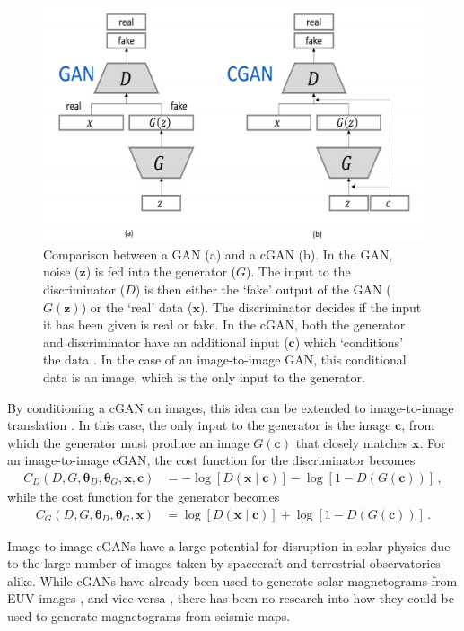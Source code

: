 \documentclass[11pt,a4paper,onecolumn]{report}
\begin{document}
\begin{figure}[t]
  \centering
  \includegraphics[width = 0.6\linewidth]{gan_cgan.png}
  \caption{Comparison between a GAN (a) and a cGAN (b). In the GAN, noise
  (\(\bm{z}\)) is fed into the generator (\(G\)). The input to the discriminator
  (\(D\)) is then either the `fake' output of the GAN (\(G(\bm{z})\)) or the
  `real' data (\(\bm{x}\)). The discriminator decides if the input it has been
  given is real or fake. In the cGAN, both the generator and discriminator have
  an additional input (\(\bm{c}\)) which `conditions' the data
  \citep{mirza_conditional_2014}. In the case of an image-to-image GAN, this
  conditional data is an image, which is the only input to the generator. }
  \label{fig:gans}
\end{figure}


By conditioning a cGAN on images, this idea can be extended to image-to-image
translation \citep{isola2017image}. In this case, the only input to the generator
is the image \(\bm{c}\), from which the generator must produce an image
\(G(\bm{c})\) that closely matches \(\bm{x}\). For an image-to-image cGAN, the
cost function for the discriminator becomes
\begin{align}
  C_D(D, G, \bm{\theta}_D, \bm{\theta}_G, \bm{x}, \bm{c}) &=
  -\log[D(\bm{x}\mid \bm{c})] - \log[1 - D(G(\bm{c}))]\,,
\end{align}
while the cost function for the generator becomes
\begin{align}
  C_G(D, G, \bm{\theta}_D, \bm{\theta}_G, \bm{x})
  &= \log[D(\bm{x}\mid \bm{c})] + \log[1 - D(G(\bm{c}))]\,.
\end{align}


Image-to-image cGANs have a large potential for disruption in solar physics due
to the large number of images taken by spacecraft and terrestrial observatories
alike. While cGANs have already been used to generate solar magnetograms from EUV images
\citep{Kim2019}, and vice versa \citep{park_generation_2019}, there has been no
research into how they could be used to generate magnetograms from seismic maps.
\end{document}
